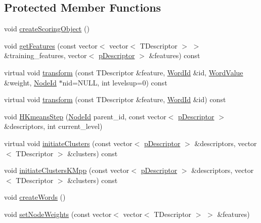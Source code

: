 \subsection*{Protected Member Functions}
\begin{DoxyCompactItemize}
\item 
void \mbox{\hyperlink{class_d_bo_w2_1_1_templated_vocabulary_a3244d5a3d0f75ba9c9ae905c5365335d}{create\+Scoring\+Object}} ()
\item 
void \mbox{\hyperlink{class_d_bo_w2_1_1_templated_vocabulary_ace8155a70fa5163d117dc6a2ef923205}{get\+Features}} (const vector$<$ vector$<$ T\+Descriptor $>$ $>$ \&training\+\_\+features, vector$<$ \mbox{\hyperlink{class_d_bo_w2_1_1_templated_vocabulary_a40913d67e369e6993c2eab80a968f829}{p\+Descriptor}} $>$ \&features) const
\item 
virtual void \mbox{\hyperlink{class_d_bo_w2_1_1_templated_vocabulary_a5af7e18ab438c3fbbb51bd9930c43444}{transform}} (const T\+Descriptor \&feature, \mbox{\hyperlink{namespace_d_bo_w2_ab1a0d3283b2d4690a383372ed20bfeb5}{Word\+Id}} \&id, \mbox{\hyperlink{namespace_d_bo_w2_a55fcd7333e591a38e96b91f41bc182f6}{Word\+Value}} \&weight, \mbox{\hyperlink{namespace_d_bo_w2_a3a0fa9c50c0df508759362d6204566f2}{Node\+Id}} $\ast$nid=N\+U\+LL, int levelsup=0) const
\item 
virtual void \mbox{\hyperlink{class_d_bo_w2_1_1_templated_vocabulary_a48a53ffe060c205e44ddd2e173eb96c4}{transform}} (const T\+Descriptor \&feature, \mbox{\hyperlink{namespace_d_bo_w2_ab1a0d3283b2d4690a383372ed20bfeb5}{Word\+Id}} \&id) const
\item 
void \mbox{\hyperlink{class_d_bo_w2_1_1_templated_vocabulary_ab79623d30a8550414e1f4bf916869f05}{H\+Kmeans\+Step}} (\mbox{\hyperlink{namespace_d_bo_w2_a3a0fa9c50c0df508759362d6204566f2}{Node\+Id}} parent\+\_\+id, const vector$<$ \mbox{\hyperlink{class_d_bo_w2_1_1_templated_vocabulary_a40913d67e369e6993c2eab80a968f829}{p\+Descriptor}} $>$ \&descriptors, int current\+\_\+level)
\item 
virtual void \mbox{\hyperlink{class_d_bo_w2_1_1_templated_vocabulary_a3915e44667d32130e17791147730b7da}{initiate\+Clusters}} (const vector$<$ \mbox{\hyperlink{class_d_bo_w2_1_1_templated_vocabulary_a40913d67e369e6993c2eab80a968f829}{p\+Descriptor}} $>$ \&descriptors, vector$<$ T\+Descriptor $>$ \&clusters) const
\item 
void \mbox{\hyperlink{class_d_bo_w2_1_1_templated_vocabulary_aa4c94955c7e03ec39fc0d9b9ce60009f}{initiate\+Clusters\+K\+Mpp}} (const vector$<$ \mbox{\hyperlink{class_d_bo_w2_1_1_templated_vocabulary_a40913d67e369e6993c2eab80a968f829}{p\+Descriptor}} $>$ \&descriptors, vector$<$ T\+Descriptor $>$ \&clusters) const
\item 
void \mbox{\hyperlink{class_d_bo_w2_1_1_templated_vocabulary_a9b74d107b7dc6142cbed4e6ef44a8519}{create\+Words}} ()
\item 
void \mbox{\hyperlink{class_d_bo_w2_1_1_templated_vocabulary_af7bf0ecd2d1ecc7d31ddca3aa7d1ddc8}{set\+Node\+Weights}} (const vector$<$ vector$<$ T\+Descriptor $>$ $>$ \&features)
\end{DoxyCompactItemize}
